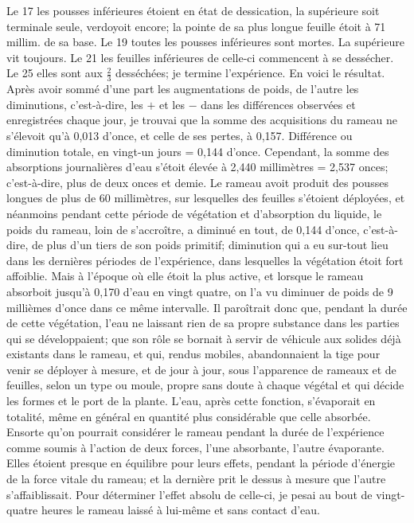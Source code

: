 Le 17 les pousses inférieures étoient en état de dessication, la supérieure soit terminale seule, verdoyoit encore; la pointe de sa plus longue feuille étoit à 71 millim. de sa base.
Le 19 toutes les pousses inférieures sont mortes. La supérieure vit toujours.
\setcounter{page}{181}
Le 21 les feuilles inférieures de celle-ci commencent à se dessécher.
Le 25 elles sont aux $\frac{2}{3}$ desséchées; je termine l'expérience. En voici le résultat.
Après avoir sommé d'une part les augmentations de poids, de l'autre les diminutions, c'est-à-dire, les $+$ et les $-$ dans les différences observées et enregistrées chaque jour, je trouvai que la somme des acquisitions du rameau ne s'élevoit qu'à 0,013 d'once, et celle de ses pertes, à 0,157. Différence ou diminution totale, en vingt-un jours = 0,144 d'once.
Cependant, la somme des absorptions journalières d'eau s'étoit élevée à 2,440 millimètres = 2,537 onces; c'est-à-dire, plus de deux onces et demie. Le rameau avoit produit des pousses longues de plus de 60 millimètres, sur lesquelles des feuilles s'étoient déployées, et néanmoins pendant cette période de végétation et d'absorption du liquide, le poids du rameau, loin de s'accroître, a diminué en tout, de 0,144 d'once, c'est-à-dire, de plus d'un tiers de son poids primitif; diminution qui a eu sur-tout lieu dans les dernières périodes de l'expérience, dans lesquelles la végétation étoit fort affoiblie. Mais à l'époque où elle étoit la plus active, et lorsque le rameau absorboit jusqu'à 0,170 d'eau en vingt\setcounter{page}{182} quatre, on l'a vu diminuer de poids de 9 millièmes d'once dans ce même intervalle.
Il paroîtrait donc que, pendant la durée de cette végétation, l'eau ne laissant rien de sa propre substance dans les parties qui se développaient; que son rôle se bornait à servir de véhicule aux solides déjà existants dans le rameau, et qui, rendus mobiles, abandonnaient la tige pour venir se déployer à mesure, et de jour à jour, sous l'apparence de rameaux et de feuilles, selon un type ou moule, propre sans doute à chaque végétal et qui décide les formes et le port de la plante.
L'eau, après cette fonction, s'évaporait en totalité, même en général en quantité plus considérable que celle absorbée.
Ensorte qu'on pourrait considérer le rameau pendant la durée de l'expérience comme soumis à l'action de deux forces, l'une absorbante, l'autre évaporante.
Elles étoient presque en équilibre pour leurs effets, pendant la période d'énergie de la force vitale du rameau; et la dernière prit le dessus à mesure que l'autre s'affaiblissait.
Pour déterminer l'effet absolu de celle-ci, je pesai au bout de vingt-quatre heures le rameau laissé à lui-même et sans contact d'eau.
